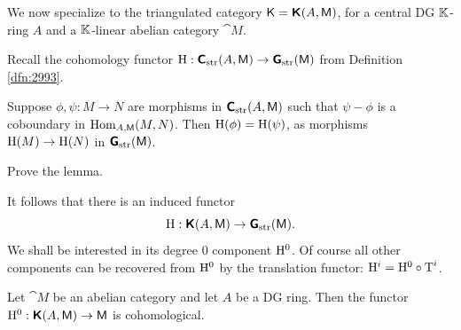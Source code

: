  \label{subsec:def-der-cat}

We now specialize to the triangulated category 
$\operatorname{\mathsf{K}} = \boldsymbol{\mathsf{K}}(A, \operatorname{\mathsf{M}})$, for a central DG $\mathbb{K}$-ring $A$ and 
a $\mathbb{K}$-linear abelian category $\cat{M}$. 

Recall the cohomology functor 
$\operatorname{H} : \boldsymbol{\mathsf{C}}_{\mathrm{str}}(A, \operatorname{\mathsf{M}}) \to 
\boldsymbol{\mathsf{G}}_{\mathrm{str}}(\operatorname{\mathsf{M}})$
from Definition \ref{dfn:2993}. 

\begin{lem} \label{lem:2320}
Suppose $\phi, \psi : M \to N$ are morphisms in 
$\boldsymbol{\mathsf{C}}_{\mathrm{str}}(A, \operatorname{\mathsf{M}})$ such that 
$\psi - \phi$ is a coboundary in $\operatorname{Hom}_{A, \operatorname{\mathsf{M}}}(M, N)$. 
Then $\operatorname{H}(\phi) = \operatorname{H}(\psi)$, as morphisms 
$\operatorname{H}(M) \to \operatorname{H}(N)$ in $\boldsymbol{\mathsf{G}}_{\mathrm{str}}(\operatorname{\mathsf{M}})$. 
\end{lem}

\begin{exer} \label{exer:2320}
Prove the lemma. 
\end{exer}

It follows that there is an induced functor 
\begin{equation} \label{eqn:4985}
\operatorname{H} : \boldsymbol{\mathsf{K}}(A, \operatorname{\mathsf{M}}) \to \boldsymbol{\mathsf{G}}_{\mathrm{str}}(\operatorname{\mathsf{M}}) . 
\end{equation}
We shall be interested in its degree $0$ component 
$\mathrm{H}^0$. Of course all other components can be recovered from $\mathrm{H}^0$
by the translation functor: 
$\mathrm{H}^i = \mathrm{H}^0 \circ \operatorname{T}^i$.

\begin{prop} \label{prop:1475}
Let $\cat{M}$ be an abelian category and let $A$ be a DG ring. Then the functor 
$\mathrm{H}^0 : \boldsymbol{\mathsf{K}}(A, \operatorname{\mathsf{M}}) \to \operatorname{\mathsf{M}}$
is cohomological. 
\end{prop}

